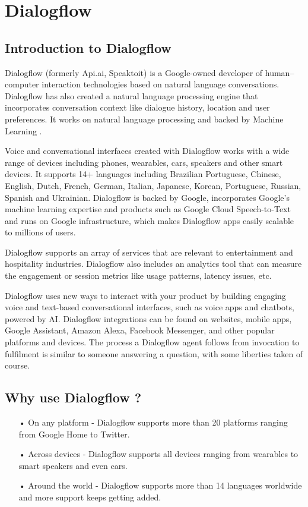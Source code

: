 \documentclass[14pt,a4paper]{article}
\begin{document}
\section{Dialogflow}
\subsection{Introduction to Dialogflow}
\par Dialogflow (formerly Api.ai, Speaktoit) is a Google-owned developer of human–computer interaction technologies based on natural language conversations. Dialogflow has also created a natural language processing engine that incorporates conversation context like dialogue history, location and user preferences. It works on natural language processing and backed by Machine Learning .

\par Voice and conversational interfaces created with Dialogflow works with a wide range of devices including phones, wearables, cars, speakers and other smart devices. It supports 14+ languages including Brazilian Portuguese, Chinese, English, Dutch, French, German, Italian, Japanese, Korean, Portuguese, Russian, Spanish and Ukrainian. Dialogflow is backed by Google, incorporates Google's machine learning expertise and products such as Google Cloud Speech-to-Text and runs on Google infrastructure, which makes Dialogflow apps easily scalable to millions of users.

\par Dialogflow supports an array of services that are relevant to entertainment and hospitality industries. Dialogflow also includes an analytics tool that can measure the engagement or session metrics like usage patterns, latency issues, etc. 

\par Dialogflow uses new ways to interact with your product by building engaging voice and text-based conversational interfaces, such as voice apps and chatbots, powered by AI. Dialogflow integrations can be found on websites, mobile apps, Google Assistant, Amazon Alexa, Facebook Messenger, and other popular platforms and devices. 
The process a Dialogflow agent follows from invocation to fulfilment is similar to someone answering a question, with some liberties taken of course.

\subsection{Why use Dialogflow ?}
\begin{enumerate}
\item[•] On any platform - Dialogflow supports more than 20 platforms ranging from Google Home to Twitter.
\item[•] Across devices - Dialogflow supports all devices ranging from wearables to smart speakers and even cars.
\item[•] Around the world - Dialogflow supports more than 14 languages worldwide and more support keeps getting added.
\end{enumerate}
\end{document}

